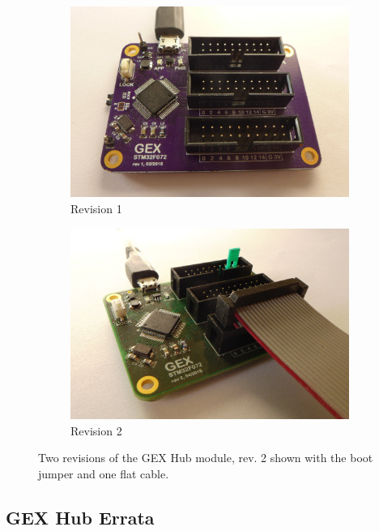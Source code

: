 \begin{figure}[h]
	\centering
	\begin{subfigure}{.5\textwidth}
		\centering
		\includegraphics[width=.98\linewidth]{img/photo-hub1.jpg}
		\caption{\label{fig:gexhub1}Revision 1}
	\end{subfigure}%
	\begin{subfigure}{.5\textwidth}
		\centering
		\includegraphics[width=.98\linewidth]{img/photo-hub2.jpg}
		\caption{\label{fig:gexhub2}Revision 2}
	\end{subfigure}
	\caption[The GEX Hub module]{\label{fig:gexhub} Two revisions of the GEX Hub module, rev. 2 shown with the boot jumper and one flat cable.}
\end{figure}

\subsection{GEX Hub Errata}

